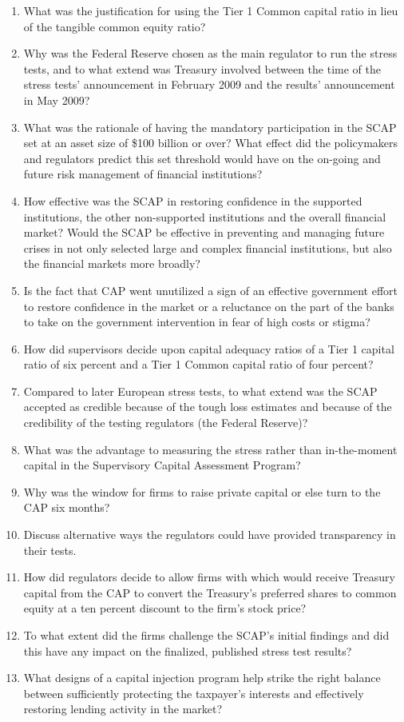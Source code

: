 \documentclass[justified, nobib]{tufte-handout2}
\begin{document}
\begin{enumerate}
\def\labelenumi{\arabic{enumi}.}
\item
  What was the justification for using the Tier 1 Common capital ratio
  in lieu of the tangible common equity ratio?
\item
  Why was the Federal Reserve chosen as the main regulator to run the
  stress tests, and to what extend was Treasury involved between the
  time of the stress tests' announcement in February 2009 and the
  results' announcement in May 2009?
\item
  What was the rationale of having the mandatory participation in the
  SCAP set at an asset size of \$100 billion or over? What effect did
  the policymakers and regulators predict this set threshold would have
  on the on-going and future risk management of financial institutions?
\item
  How effective was the SCAP in restoring confidence in the supported
  institutions, the other non-supported institutions and the overall
  financial market? Would the SCAP be effective in preventing and
  managing future crises in not only selected large and complex
  financial institutions, but also the financial markets more broadly?
\item
  Is the fact that CAP went unutilized a sign of an effective government
  effort to restore confidence in the market or a reluctance on the part
  of the banks to take on the government intervention in fear of high
  costs or stigma?
\item
  How did supervisors decide upon capital adequacy ratios of a Tier 1
  capital ratio of six\citep{Metrick} percent and a Tier 1 Common capital ratio of four
  percent?
\item
  Compared to later European stress tests, to what extend was the SCAP
  accepted as credible because of the tough loss estimates and because
  of the credibility of the testing regulators (the Federal Reserve)?
\item
  What was the advantage to measuring the stress rather than
  in-the-moment capital in the Supervisory Capital Assessment Program?
\item
  Why was the window for firms to raise private capital or else turn to
  the CAP six months?
\item
  Discuss alternative ways the regulators could have provided
  transparency in their tests.
\item
  How did regulators decide to allow firms with which would receive
  Treasury capital from the CAP to convert the Treasury's preferred
  shares to common equity at a ten percent discount to the firm's stock
  price?
\item
  To what extent did the firms challenge the SCAP's initial findings and
  did this have any impact on the finalized, published stress test
  results?
\item
  What designs of a capital injection program help strike the right
  balance between sufficiently protecting the taxpayer's interests and
  effectively restoring lending activity in the market?
\end{enumerate}
\end{document}
